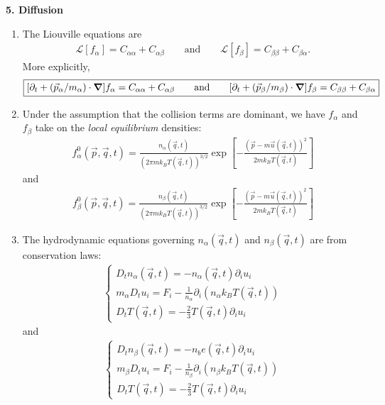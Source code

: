 \documentclass{article}
\theoremstyle{definition}
\newcommand{\p}{\partial}
\newcommand{\lag}{\mathcal{L}}
\newcommand{\al}{\alpha}
\newcommand{\be}{\beta}
\newcommand{\f}[2]{\frac{#1}{#2}}
\newcommand{\lb}{\left[}
\newcommand{\rb}{\right]}
\begin{document}
\noindent \textbf{5. Diffusion}

\begin{enumerate}[label=(\alph*)]
	\item The Liouville equations are
	\begin{align*}
	\lag[f_\al] = C_{\al\al} + C_{\al\be} \quad\quad \text{and} \quad\quad \lag[f_\be] = C_{\be\be} + C_{\be\al}.
	\end{align*}
	More explicitly,
	\begin{align*}
	\boxed{[\p_t + (\vec{p}_\al / m_\al) \cdot \grad ] f_\al = C_{\al\al} + C_{\al\be} 
	\quad\quad \text{and} \quad\quad 
	[\p_t + (\vec{p}_\be / m_\be) \cdot \grad ] f_\be = C_{\be\be} + C_{\be\al}}
	\end{align*}
	
	\item Under the assumption that the collision terms are dominant, we have $f_\al$ and $f_\be$ take on the \textit{local equilibrium} densities:
	\begin{align*}
	\boxed{f_\al^0(\vec{p},\vec{q},t) = \f{n_\al(\vec{q},t)}{(2\pi m k_B T (\vec{q},t))^{3/2}} \exp\lb -\f{(\vec{p} - m\vec{u}(\vec{q},t))^2}{2m k_B T(\vec{q},t)} \rb}
	\end{align*}
	and 
	\begin{align*}
	\boxed{f_\be^0(\vec{p},\vec{q},t) = \f{n_\be(\vec{q},t)}{(2\pi m k_B T (\vec{q},t))^{3/2}} \exp\lb -\f{(\vec{p} - m\vec{u}(\vec{q},t))^2}{2m k_B T(\vec{q},t)} \rb}
	\end{align*}
	
	
	
	\item The hydrodynamic equations governing $n_\al(\vec{q},t)$ and $n_\be(\vec{q},t)$ are from conservation laws:
	\begin{align*}
	\boxed{\begin{cases}
	{D_t n_\al(\vec{q},t) = -n_\al(\vec{q},t) \p_i u_i} \\
	m_\al D_t u_i = F_i - \f{1}{n_\al}\p_i (n_\al k_B T(\vec{q},t))\\
	D_t T(\vec{q},t) = -\f{2}{3}T(\vec{q},t)\p_i u_i
	\end{cases}	}
	\end{align*}
	and
	\begin{align*}
	\boxed{\begin{cases}
	{D_t n_\be(\vec{q},t) = -n_be(\vec{q},t) \p_i u_i} \\
	m_\be D_t u_i = F_i - \f{1}{n_\be}\p_i (n_\be k_B T(\vec{q},t))\\
	D_t T(\vec{q},t) = -\f{2}{3}T(\vec{q},t)\p_i u_i
	\end{cases}	}
	\end{align*}
	

\end{enumerate}
\end{document}
